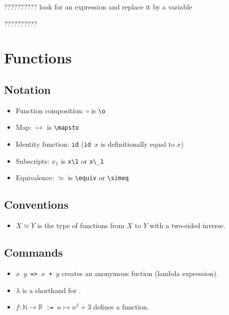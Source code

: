 \documentclass[a4paper]{article}
\newcommand{\N}{\mathbb{N}}
\newcommand{\R}{\mathbb{R}}
\begin{document}
 ?????????? look for an expression and replace it by a variable

 ??????????


\section{Functions}

\subsection*{Notation}

\begin{itemize}
    \item Function composition: $\circ$ is \verb|\o|
    \item Map: $\mapsto$ is \verb|\mapsto|
    \item Identity function: \verb|id| (\texttt{id $x$} is definitionally equal to $x$)
    \item Subscripts: $x_1$ is \verb|x\1| or \verb|x\_1|
    \item Equivalence: $\simeq$ is \verb|\equiv| or \verb|\simeq|
\end{itemize}

\subsection*{Conventions}

\begin{itemize}
    \item $X \simeq Y$ is the type of functions from $X$ to $Y$ with a two-sided inverse.
\end{itemize}

\subsection*{Commands}


\begin{itemize}
    \item \texttt{\fun $x$ $y$ => $x$ + $y$} creates an anonymous fuction (lambda expression).
    \item $\lambda$ is a shorthand for \fun.
\end{itemize}


\begin{itemize}
    \item \texttt{\ddef $f : \N \to \R$ := \fun $n \mapsto n^2 + 3$} defines a function.
\end{itemize}
\end{document}
